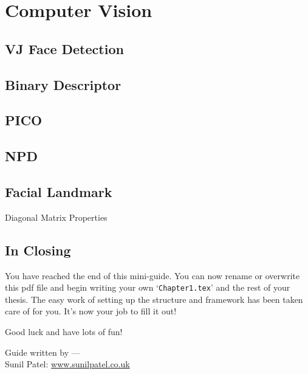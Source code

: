 \chapter{Computer Vision} %

\label{Chapter5} %


\section{VJ Face Detection}
\section{Binary Descriptor}
\section{PICO}
\section{NPD}
\section{Facial Landmark}
\begin{compactitem}

\item Diagonal Matrix Properties
\end{compactitem}


\section{In Closing}

You have reached the end of this mini-guide. You can now rename or overwrite this pdf file and begin writing your own `\texttt{Chapter1.tex}' and the rest of your thesis. The easy work of setting up the structure and framework has been taken care of for you. It's now your job to fill it out!

Good luck and have lots of fun!

\begin{flushright}
Guide written by ---\\
Sunil Patel: \href{http://www.sunilpatel.co.uk}{www.sunilpatel.co.uk}
\end{flushright}
